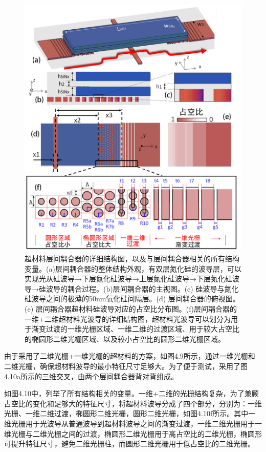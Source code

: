 \begin{figure}[!htbp]
    \centering
    \includegraphics[width=1\textwidth]{Img/4-10.png}
    \caption{超材料层间耦合器的详细结构图，以及与层间耦合器相关的所有结构变量。(a)层间耦合器的整体结构外观，有双层氮化硅的波导层，可以实现光从硅波导→下层氮化硅波导→上层氮化硅波导→下层氮化硅波导→硅波导的耦合过程。(b)层间耦合器的主视图。(c) 硅波导与氮化硅波导之间的极薄的50nm氧化硅间隔层。(d) 层间耦合器的俯视图。(e) 层间耦合器超材料硅波导对应的占空比分布图。(f)层间耦合器的一维+二维超材料光波导的详细结构图，超材料光波导可以划分为用于渐变过渡的一维光栅区域、一维二维的过渡区域、用于较大占空比的椭圆形二维光栅区域、以及较小占空比的圆形二维光栅区域。}
    \label{fig:4-10}
\end{figure}

由于采用了二维光栅+一维光栅的超材料的方案，如图4.9所示，通过一维光栅和二维光栅，确保超材料波导的最小特征尺寸足够大。为了便于测试，采用了图4.10a所示的三维交叉，由两个层间耦合器背对背组成。

如图4.10中，列举了所有结构相关的变量。一维+二维的光栅结构复杂，为了兼顾占空比的变化和足够大的特征尺寸，将超材料波导分成了四个部分，分别为：一维光栅、一维二维过渡，椭圆形二维光栅，圆形二维光栅，如图4.10f所示。其中一维光栅用于光波导从普通波导到超材料波导之间的渐变过渡，一维二维光栅用于一维光栅与二维光栅之间的过渡，椭圆形二维光栅用于高占空比的二维光栅，椭圆形可提升特征尺寸，避免二维光栅柱，而圆形二维光栅用于低占空比的二维光栅。\cite{Bock2010Subwavelength}

